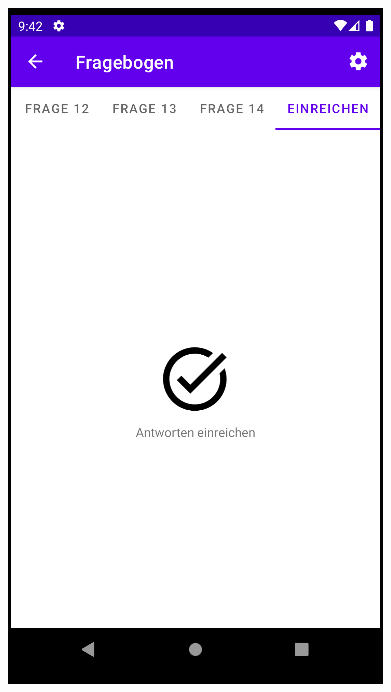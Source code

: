 \documentclass{article}
\begin{document}
\begin{center}
    \includegraphics[scale=0.45]{survey_end.png}
\end{center}



\newpage
\end{document}
